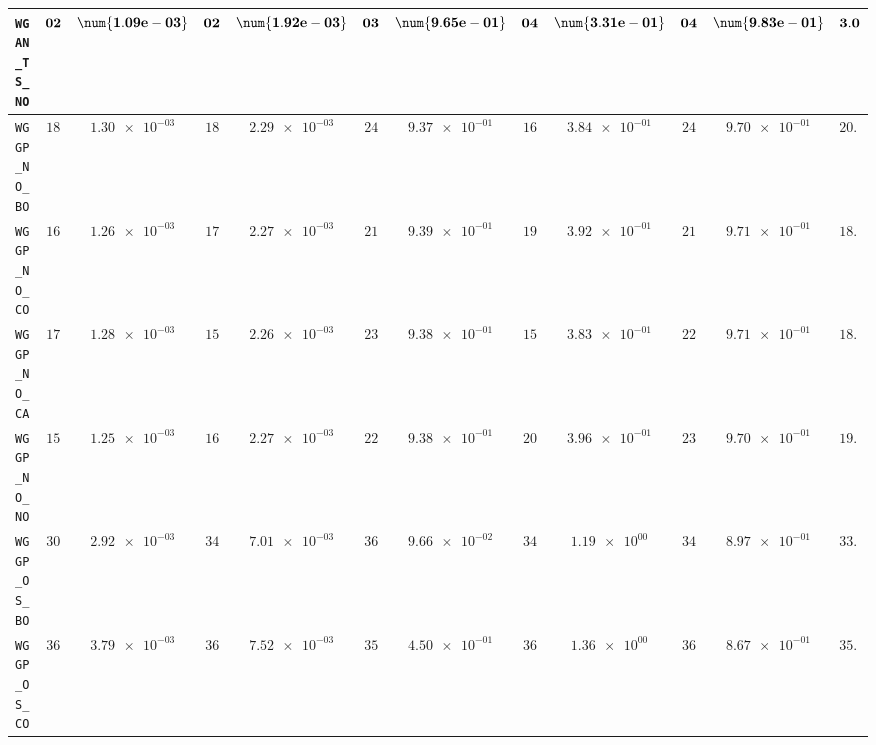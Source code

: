 \begin{table}[H]
\begin{tabularx}{\textwidth}{l||cC|cC|cC|cC|cC||c}
		\texttt{WGAN\_TS\_NO} & $\bf 02$ & $\bf \num{1.09e-03}$ & $\bf 02$ & $\bf \num{1.92e-03}$ & $\bf 03$ & $\bf \num{9.65e-01}$ & $\bf 04$ & $\bf \num{3.31e-01}$ & $\bf 04$ & $\bf \num{9.83e-01}$ & $\bf 3.0$  \\ \hline
		\texttt{WGGP\_NO\_BO} & $ 18$ & $ \num{1.30e-03}$ & $ 18$ & $ \num{2.29e-03}$ & $ 24$ & $ \num{9.37e-01}$ & $ 16$ & $ \num{3.84e-01}$ & $ 24$ & $ \num{9.70e-01}$ & $ 20.0$  \\
		\texttt{WGGP\_NO\_CO} & $ 16$ & $ \num{1.26e-03}$ & $ 17$ & $ \num{2.27e-03}$ & $ 21$ & $ \num{9.39e-01}$ & $ 19$ & $ \num{3.92e-01}$ & $ 21$ & $ \num{9.71e-01}$ & $ 18.8$  \\
		\texttt{WGGP\_NO\_CA} & $ 17$ & $ \num{1.28e-03}$ & $ 15$ & $ \num{2.26e-03}$ & $ 23$ & $ \num{9.38e-01}$ & $ 15$ & $ \num{3.83e-01}$ & $ 22$ & $ \num{9.71e-01}$ & $ 18.4$  \\
		\texttt{WGGP\_NO\_NO} & $ 15$ & $ \num{1.25e-03}$ & $ 16$ & $ \num{2.27e-03}$ & $ 22$ & $ \num{9.38e-01}$ & $ 20$ & $ \num{3.96e-01}$ & $ 23$ & $ \num{9.70e-01}$ & $ 19.2$  \\
		\texttt{WGGP\_OS\_BO} & $ 30$ & $ \num{2.92e-03}$ & $ 34$ & $ \num{7.01e-03}$ & $ 36$ & $ \num{9.66e-02}$ & $ 34$ & $ \num{1.19e+00}$ & $ 34$ & $ \num{8.97e-01}$ & $ 33.6$  \\
		\texttt{WGGP\_OS\_CO} & $ 36$ & $ \num{3.79e-03}$ & $ 36$ & $ \num{7.52e-03}$ & $ 35$ & $ \num{4.50e-01}$ & $ 36$ & $ \num{1.36e+00}$ & $ 36$ & $ \num{8.67e-01}$ & $ 35.8$  \\

\end{tabularx}
\end{table}
